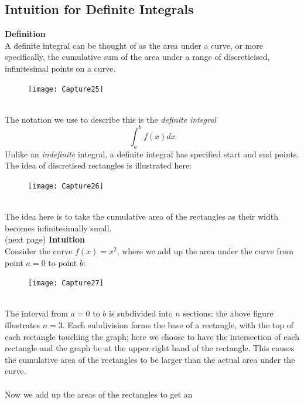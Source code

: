 \documentclass{report}
\begin{document}
\subsection{Intuition for Definite Integrals} %
\textbf{Definition}\\
A definite integral can be thought of as the area under a curve,
or more specifically, the cumulative sum of the area under a range of discreticised, 
infinitesimal points on a curve.
\begin{figure}[h]
\texttt{[image: Capture25]}\\
\centering
{}
\end{figure}\\
The notation we use to describe this is the \textit{definite integral}
\begin{equation*}
\int_a^bf(x)dx
\end{equation*}
Unlike an \textit{indefinite} integral, a definite integral has specified
start and end points.
The idea of discretised rectangles is illustrated here:
\begin{figure}[h]
\texttt{[image: Capture26]}\\
\centering
{}
\end{figure}\\
The idea here is to take the cumulative area of the rectangles as
their width becomes infinitesimally small.\\
(next page)
\newpage
\noindent\textbf{Intuition}\\
Consider the curve $f(x)=x^2$, where we add up the area under
the curve from point $a=0$ to point $b$:
\begin{figure}[h]
\texttt{[image: Capture27]}\\
\centering
{}
\end{figure}\\
The interval from $a=0$ to $b$ is subdivided into $n$ sections; the above figure illustrates $n=3$. 
Each subdivision forms the base of a rectangle, with the top of each rectangle touching the graph;
here we choose to have the intersection of each rectangle and the graph be at the
upper right hand of the rectangle. This causes the cumulative area of the rectangles
to be larger than the actual area under the curve.\\
\vspace{1mm}\\
Now we add up the areas of the rectangles to get an
\end{document}

